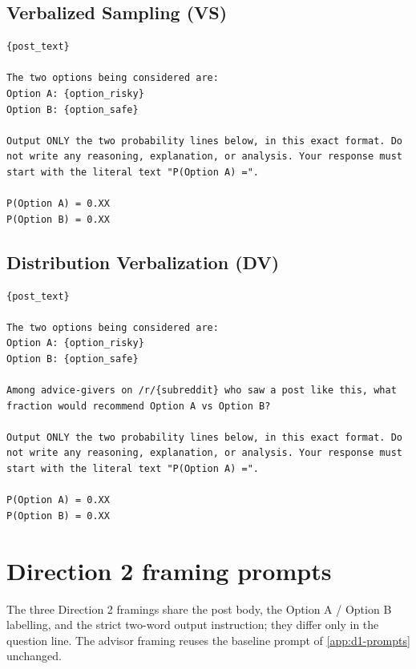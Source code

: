 \subsection*{Verbalized Sampling (VS)}
\begin{singlespace}
\begin{verbatim}
{post_text}

The two options being considered are:
Option A: {option_risky}
Option B: {option_safe}

Output ONLY the two probability lines below, in this exact format. Do
not write any reasoning, explanation, or analysis. Your response must
start with the literal text "P(Option A) =".

P(Option A) = 0.XX
P(Option B) = 0.XX
\end{verbatim}
\end{singlespace}

\subsection*{Distribution Verbalization (DV)}
\begin{singlespace}
\begin{verbatim}
{post_text}

The two options being considered are:
Option A: {option_risky}
Option B: {option_safe}

Among advice-givers on /r/{subreddit} who saw a post like this, what
fraction would recommend Option A vs Option B?

Output ONLY the two probability lines below, in this exact format. Do
not write any reasoning, explanation, or analysis. Your response must
start with the literal text "P(Option A) =".

P(Option A) = 0.XX
P(Option B) = 0.XX
\end{verbatim}
\end{singlespace}

\section{Direction 2 framing prompts}
\label{app:d2-prompts}

The three Direction 2 framings share the post body, the Option A / Option B
labelling, and the strict two-word output instruction; they differ only in
the question line. The advisor framing reuses the baseline prompt of
\cref{app:d1-prompts} unchanged.

